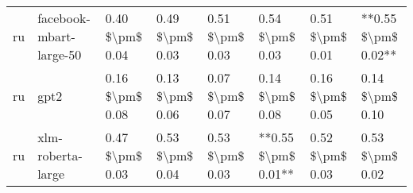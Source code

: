 \begin{tabular}{llllllll}
      ru &            facebook-mbart-large-50 & 0.40 \$\textbackslash pm\$ 0.04 &           0.49 \$\textbackslash pm\$ 0.03 &       0.51 \$\textbackslash pm\$ 0.03 &        0.54 \$\textbackslash pm\$ 0.03 &                         0.51 \$\textbackslash pm\$ 0.01 & **0.55 \$\textbackslash pm\$ 0.02** \\
      ru &                               gpt2 & 0.16 \$\textbackslash pm\$ 0.08 &           0.13 \$\textbackslash pm\$ 0.06 &       0.07 \$\textbackslash pm\$ 0.07 &        0.14 \$\textbackslash pm\$ 0.08 &                         0.16 \$\textbackslash pm\$ 0.05 &     0.14 \$\textbackslash pm\$ 0.10 \\
      ru &                  xlm-roberta-large & 0.47 \$\textbackslash pm\$ 0.03 &           0.53 \$\textbackslash pm\$ 0.04 &       0.53 \$\textbackslash pm\$ 0.03 &    **0.55 \$\textbackslash pm\$ 0.01** &                         0.52 \$\textbackslash pm\$ 0.03 &     0.53 \$\textbackslash pm\$ 0.02 \\
\bottomrule
\end{tabular}
